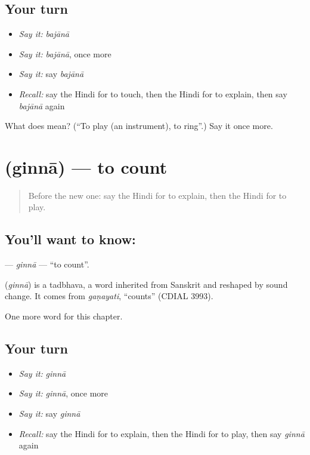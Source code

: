 \subsection*{Your turn}
\begin{itemize}
\raggedright
  \item \emph{Say it:} \emph{bajānā}
  \item \emph{Say it:} \emph{bajānā}, once more
  \item \emph{Say it:} say \emph{bajānā}
  \item \emph{Recall:} say the Hindi for to touch, then the Hindi for to explain, then say \emph{bajānā} again
\end{itemize}

\begin{tcolorbox}[breakable,colback=teal!4,colframe=teal!35!black,title={Before you move on}]
What does  mean? (\textquotedblleft{}To play (an instrument), to ring\textquotedblright{}.) Say it once more.
\end{tcolorbox}
\section[\texorpdfstring{\hi{गिनना} (ginnā)}{गिनना (ginnā)}]{ (ginnā) — to count}

\label{lesson:HI-C165-ginna}



\begin{quote}
Before the new one: say the Hindi for to explain, then the Hindi for to play.
\end{quote}

\subsection*{You'll want to know: }
\textbf{} — \emph{ginnā} — \textquotedblleft{}to count\textquotedblright{}.

\begin{cousinweb}
\textbf{} (\emph{ginnā}) is a tadbhava, a word inherited from Sanskrit and reshaped by sound change. It comes from \emph{gaṇayati}, \textquotedblleft{}counts\textquotedblright{} (CDIAL 3993).
\end{cousinweb}

\begin{grammarlens}[title={What you've built}]
One more word for this chapter.
\end{grammarlens}

\subsection*{Your turn}
\begin{itemize}
\raggedright
  \item \emph{Say it:} \emph{ginnā}
  \item \emph{Say it:} \emph{ginnā}, once more
  \item \emph{Say it:} say \emph{ginnā}
  \item \emph{Recall:} say the Hindi for to explain, then the Hindi for to play, then say \emph{ginnā} again
\end{itemize}

